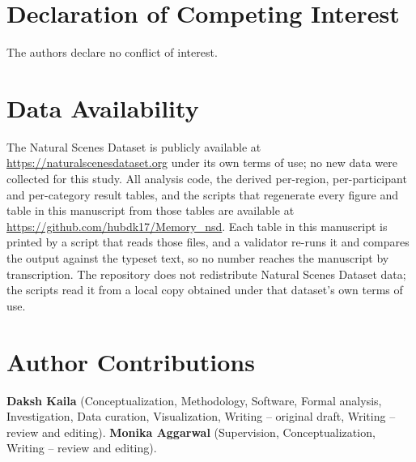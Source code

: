 \documentclass[11pt,a4paper]{article}
\begin{document}
\section*{Declaration of Competing Interest}

The authors declare no conflict of interest.

\section*{Data Availability}

The Natural Scenes Dataset is publicly available at
\url{https://naturalscenesdataset.org} under its own terms of use; no new data
were collected for this study. All analysis code, the derived per-region,
per-participant and per-category result tables, and the scripts that regenerate
every figure and table in this manuscript from those tables are available at
\url{https://github.com/hubdk17/Memory_nsd}. Each table in this manuscript is
printed by a script that reads those files, and a validator re-runs it and
compares the output against the typeset text, so no number reaches the manuscript
by transcription. The repository does not redistribute Natural Scenes Dataset
data; the scripts read it from a local copy obtained under that dataset's own
terms of use.

\section*{Author Contributions}

\textbf{Daksh Kaila} (Conceptualization, Methodology, Software, Formal analysis,
Investigation, Data curation, Visualization, Writing -- original draft,
Writing -- review and editing).
\textbf{Monika Aggarwal} (Supervision, Conceptualization, Writing -- review and
editing).


\end{document}
